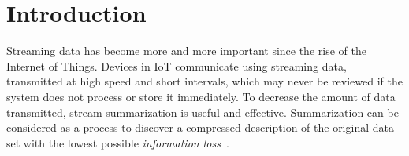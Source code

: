 \section{Introduction}

Streaming data has become more and more important since the rise of the Internet
of Things. Devices in IoT communicate using streaming data, transmitted at high
speed and short intervals, which may never be reviewed if the system does not
process or store it immediately. To decrease the amount of data transmitted,
stream summarization is useful and effective. Summarization can be considered as
a process to discover a compressed description of the original data-set with the
lowest possible \emph{information loss}~\cite{chandola2007summarization}.

